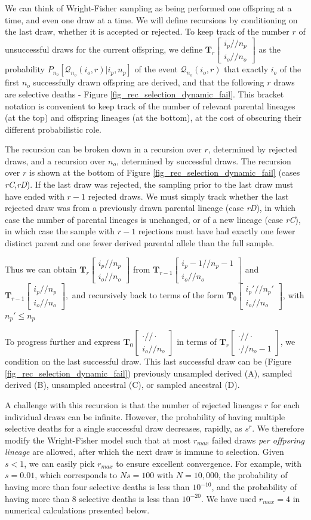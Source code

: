 \documentclass[review]{elsarticle}
\newcommand{\dslash}{/\!\!/}
\newcommand{\Coalc}[4]{\begin{bmatrix}#1\dslash #2 \\ #3\dslash #4 \end{bmatrix}}
\begin{document}
We can think of Wright-Fisher sampling as being performed one offspring at a time,
and even one draw at a time. We will define recursions by conditioning on the last draw, 
whether it is accepted or rejected.
To keep track of the number $r$ of unsuccessful draws for the current offspring, we define $\mathbf{T}_{r}\Coalc{i_p}{n_p}{i_o}{n_o}$ as the probability
$P_{n_o}\left[\mathcal{Q}_{n_o}(i_o,r) | i_p, n_p\right]$ of the event $\mathcal{Q}_{n_o}(i_o,r)$ that exactly $i_o$ of the
first $n_o$ successfully drawn offspring are derived, and that the following $r$ draws are selective
deaths - Figure \ref{fig_rec_selection_dynamic_fail}. This bracket notation is convenient to keep track of
the number of relevant parental lineages (at the top) and offspring lineages (at the bottom), at the
cost of obscuring their different probabilistic role.

The recursion can be broken down in a recursion over $r$, determined by rejected draws, 
and a recursion over $n_o$, determined by successful draws.  
The recursion over $r$ is shown at the bottom of
Figure \ref{fig_rec_selection_dynamic_fail} (cases \textit{rC,rD}). If the last draw was rejected, the sampling 
prior to the last draw must have ended with $r-1$ rejected draws. We
must simply track whether the last rejected draw was from a previously drawn parental lineage (case
\textit{rD}), in which case the number of parental lineages is unchanged, or of a new lineage (case
\textit{rC}), in which case the sample with $r-1$ rejections must have had exactly one fewer distinct parent and 
one fewer derived parental allele than the full sample.  
 
Thus we can obtain $\mathbf{T}_{r}\Coalc{i_p}{n_p}{i_o}{n_o}$ from
$\mathbf{T}_{r-1}\Coalc{i_p-1}{n_p-1}{i_o}{n_o}$ and $\mathbf{T}_{r-1}\Coalc{i_p}{n_p}{i_o}{n_o},$
and recursively back to terms of the form $\mathbf{T}_{0}\Coalc{i_p'}{n_p'}{i_o}{n_o}$, with $n_p'\leq n_p$
  
To progress further and express $\mathbf{T}_{0}\Coalc{\cdot}{\cdot}{i_o}{n_o}$ in terms of
$\mathbf{T}_{r}\Coalc{\cdot}{\cdot}{\cdot}{n_o-1}$, we condition on the last successful draw. This
last successful draw can be (Figure \ref{fig_rec_selection_dynamic_fail}) previously unsampled
derived (A), sampled derived (B), unsampled ancestral (C), or sampled ancestral (D).
  
A challenge with this recursion is that the number of rejected lineages $r$ for each individual draws 
can be infinite.
 However, the probability of having multiple selective deaths for a single successful draw decreases,
rapidly, as $s^r.$ We therefore modify the Wright-Fisher model such that at most $r_{max}$ failed
draws \emph{per offpsring lineage} are allowed, after which the next draw is immune to selection. Given
$s<1$, we can easily pick $r_{max}$ to ensure excellent convergence. For example, with $s=0.01$, 
which corresponds to $Ns=100$ with $N=10,000$, the probability of having more than 
four selective deaths is less than $10^{-10}$, and the probability of having more than 8 selective deaths is 
less than $10^{-20}.$ We have used $r_{max}=4$ in numerical calculations presented below. 
\end{document}
